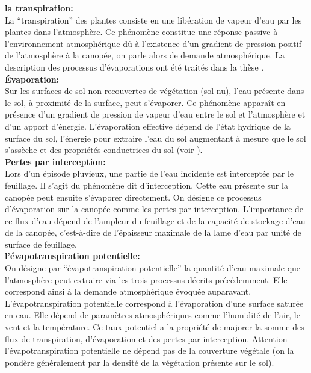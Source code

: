 \documentclass[a4paper,11pt]{article}
\begin{document}
\textbf{la transpiration:}\\

La ``transpiration'' des plantes consiste en une libération de vapeur d’eau par les plantes dans l’atmosphère. Ce phénomène constitue une réponse passive à l’environnement atmosphérique dû à l’existence d’un gradient de pression positif de l’atmosphère à la canopée, on parle alors de demande atmosphérique. La description des processus d'évaporations ont été traités dans la thèse \cite{maquin2016developpement}.\\

\textbf{Évaporation:}\\

Sur les surfaces de sol non recouvertes de végétation (sol nu), l’eau présente dans le sol, à proximité de la surface, peut s’évaporer. Ce phénomène apparaît en présence d’un gradient de pression de vapeur d’eau entre le sol et l’atmosphère et d’un apport d’énergie. L’évaporation effective dépend de l’état hydrique de la surface du sol, l’énergie pour extraire l’eau du sol augmentant à mesure que le sol s’assèche et des propriétés conductrices du sol (voir \cite{hillel2003introduction}). \\

\textbf{Pertes par interception:}\\

Lors d’un épisode pluvieux, une partie de l’eau incidente est interceptée par le feuillage. Il s’agit du phénomène dit d’interception. Cette eau présente sur la canopée peut ensuite s’évaporer directement. On désigne ce processus d’évaporation sur la canopée comme les pertes par interception. L’importance de ce flux d’eau dépend de l’ampleur du feuillage et de la capacité de stockage d’eau de la canopée, c’est-à-dire de l’épaisseur maximale de la lame d’eau par unité de surface de feuillage.\\


\textbf{l'évapotranspiration potentielle:}\\

On désigne par  ``évapotranspiration potentielle'' la quantité d’eau maximale que l’atmosphère peut extraire via les trois processus décrits précédemment. Elle correspond ainsi à la demande atmosphérique évoquée auparavant. L’évapotranspiration potentielle correspond à l’évaporation d’une surface saturée en eau. Elle dépend de paramètres atmosphériques comme l’humidité de l’air, le vent et la température. Ce taux potentiel a la propriété de majorer la somme des flux de transpiration, d’évaporation et des pertes par interception. Attention l'évapotranspiration potentielle ne dépend pas de la couverture végétale (on la pondère généralement par la densité de la végétation présente sur le sol).
\end{document}
